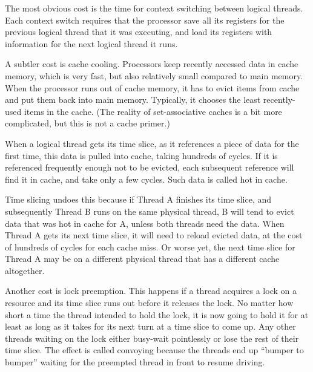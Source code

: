 The most obvious cost is the time for context switching between
logical threads. Each context switch requires that the processor save
all its registers for the previous logical thread that it was
executing, and load its registers with information for the next
logical thread it runs.

A subtler cost is cache cooling. Processors keep recently accessed
data in cache memory, which is very fast, but also relatively small
compared to main memory. When the processor runs out of cache memory,
it has to evict items from cache and put them back into main
memory. Typically, it chooses the least recently-used items in the
cache. (The reality of set-associative caches is a bit more
complicated, but this is not a cache primer.)

When a logical thread gets its time slice, as it references a piece of
data for the first time, this data is pulled into cache, taking
hundreds of cycles. If it is referenced frequently enough not to be
evicted, each subsequent reference will find it in cache, and take
only a few cycles. Such data is called hot in cache.

Time slicing undoes this because if Thread A finishes its time slice,
and subsequently Thread B runs on the same physical thread, B will
tend to evict data that was hot in cache for A, unless both threads
need the data. When Thread A gets its next time slice, it will need to
reload evicted data, at the cost of hundreds of cycles for each cache
miss. Or worse yet, the next time slice for Thread A may be on a
different physical thread that has a different cache altogether.

Another cost is lock preemption. This happens if a thread acquires a
lock on a resource and its time slice runs out before it releases the
lock. No matter how short a time the thread intended to hold the lock,
it is now going to hold it for at least as long as it takes for its
next turn at a time slice to come up. Any other threads waiting on the
lock either busy-wait pointlessly or lose the rest of their time
slice. The effect is called convoying because the threads end up
``bumper to bumper'' waiting for the preempted thread in front to resume
driving.


